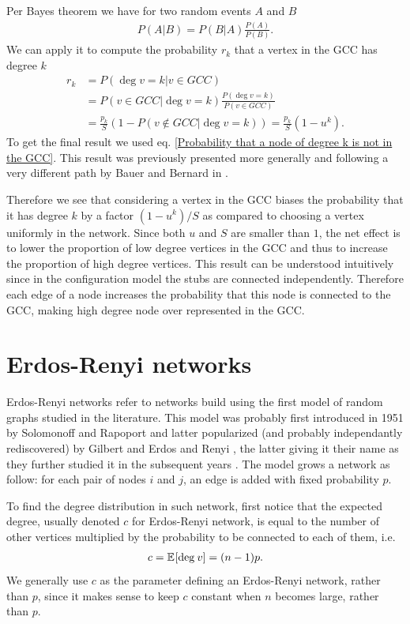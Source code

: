 \documentclass[
11pt, %
english, %
singlespacing, %
nolistspacing, %
liststotoc, %
headsepline, %
]{MastersDoctoralThesis} %
\begin{document}
Per Bayes theorem we have for two random events $A$ and $B$
\begin{align}
	P(A | B) = P(B | A) \frac{P(A)}{P(B)}. \label{Bayes theorem}
\end{align}
We can apply it to compute the probability $r_k$ that a vertex in the GCC has degree $k$
\begin{align}
	r_k &= P\left(\deg{v} = k | v \in GCC\right)\\
	&= P(v \in GCC | \deg{v} = k) \frac{P(\deg{v} = k)}{P(v \in GCC)} \\
	&= \frac{p_k}{S} \left(1 - P(v \notin GCC | \deg{v} = k)\right) =  \frac{p_k}{S} (1 - u^k). \label{Degree distribution in GCC}
\end{align}
To get the final result we used eq. \eqref{Probability that a node of degree k is not in the GCC}. This result was previously presented more generally and following a very different path by Bauer and Bernard in \cite{bauer2002maximal}.

Therefore we see that considering a vertex in the GCC biases the probability that it has degree $k$ by a factor $(1 - u^k)/S$ as compared to choosing a vertex uniformly in the network. Since both $u$ and $S$ are smaller than $1$, the net effect is to lower the proportion of low degree vertices in the GCC and thus to increase the proportion of high degree vertices. This result can be understood intuitively since in the configuration model the stubs are connected independently. Therefore each edge of a node increases the probability that this node is connected to the GCC, making high degree node over represented in the GCC.

\section{Erdos-Renyi networks}

Erdos-Renyi networks refer to networks build using the first model of random graphs studied in the literature. This model was probably first introduced in 1951 by Solomonoff and Rapoport \cite{solomonoff1951connectivity} and latter popularized (and probably independantly rediscovered) by Gilbert \cite{gilbert1959random} and Erdos and Renyi \cite{erdos1959random}, the latter giving it their name as they further studied it in the subsequent years \cite{erdos1960evolution, erdos1961strength}. The model grows a network as follow: for each pair of nodes $i$ and $j$, an edge is added with fixed probability $p$.

To find the degree distribution in such network, first notice that the expected degree, usually denoted $c$ for Erdos-Renyi network, is equal to the number of other vertices multiplied by the probability to be connected to each of them, i.e.
\begin{align}
	c = \mathbb{E}_{}\!\left[ \mathrm{deg}_{}\, v \right] = (n - 1) p.
\end{align}
We generally use $c$ as the parameter defining an Erdos-Renyi network, rather than $p$, since it makes sense to keep $c$ constant when $n$ becomes large, rather than $p$. 
\end{document}
